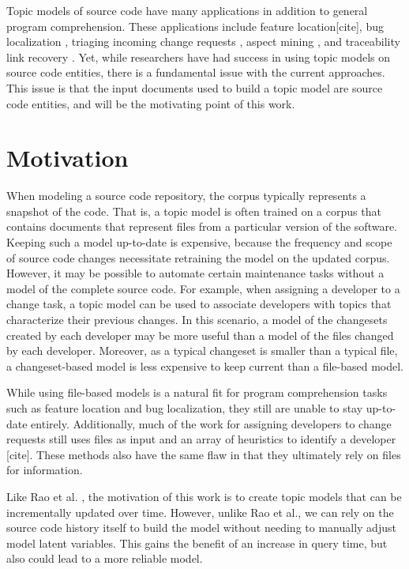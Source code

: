 \documentclass[12pt,draft]{Manuscript}
\newcommand{\attn}[1]{{\color{red}#1}}
\newcommand{\needcite}{\attn{\tiny{[cite]}}}
\begin{document}
\begin{body}
Topic models of source code have many applications in addition to
general program comprehension. These applications include feature
location\needcite, bug localization \citep{Rao-etal:2013}, triaging
incoming change requests \citep{Kagdi-etal:2012}, aspect mining
\citep{Baldi-etal:2008}, and traceability link recovery
\citep{Asuncion-etal:2010}. Yet, while researchers have had success in
using topic models on source code entities, there is a fundamental issue
with the current approaches. This issue is that the input documents used
to build a topic model are source code entities, and will be the
motivating point of this work.

\section{Motivation}\label{motivation}

When modeling a source code repository, the corpus typically represents
a snapshot of the code. That is, a topic model is often trained on a
corpus that contains documents that represent files from a particular
version of the software. Keeping such a model up-to-date is expensive,
because the frequency and scope of source code changes necessitate
retraining the model on the updated corpus. However, it may be possible
to automate certain maintenance tasks without a model of the complete
source code. For example, when assigning a developer to a change task, a
topic model can be used to associate developers with topics that
characterize their previous changes. In this scenario, a model of the
changesets created by each developer may be more useful than a model of
the files changed by each developer. Moreover, as a typical changeset is
smaller than a typical file, a changeset-based model is less expensive
to keep current than a file-based model.

While using file-based models is a natural fit for program comprehension
tasks such as feature location and bug localization, they still are
unable to stay up-to-date entirely. Additionally, much of the work for
assigning developers to change requests still uses files as input and an
array of heuristics to identify a developer
\citep{Kagdi-etal:2012}\needcite. These methods also have the same flaw
in that they ultimately rely on files for information.

Like Rao et al. \citep{Rao-etal:2013}, the motivation of this work is to
create topic models that can be incrementally updated over time.
However, unlike Rao et al., we can rely on the source code history
itself to build the model without needing to manually adjust model
latent variables. This gains the benefit of an increase in query time,
but also could lead to a more reliable model.


\end{body}
\end{document}
